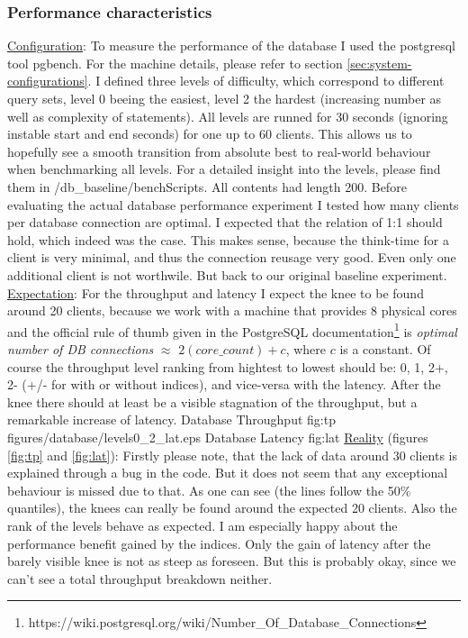 \documentclass[11pt]{article}
\begin{document}
\subsubsection{Performance characteristics}\label{sec:performance-characteristics}
\underline{Configuration}: To measure the performance of the database I used the postgresql tool pgbench. For the machine details, please refer to section \ref{sec:system-configurations}. I defined three levels of difficulty, which correspond to different query sets, level 0 beeing the easiest, level 2 the hardest (increasing number as well as complexity of statements). All levels are runned for 30 seconds (ignoring instable start and end seconds) for one up to 60 clients. This allows us to hopefully see a smooth transition from absolute best to real-world behaviour when benchmarking all levels. For a detailed insight into the levels, please find them in /db\_baseline/benchScripts. All contents had length 200. Before evaluating the actual database performance experiment I tested how many clients per database connection are optimal. I expected that the relation of 1:1 should hold, which indeed was the case. This makes sense, because the think-time for a client is very minimal, and thus the connection reusage very good. Even only one additional client is not worthwile. But back to our original baseline experiment.
\newline\underline{Expectation}: For the throughput and latency I expect the knee to be found around 20 clients, because we work with a machine that provides 8 physical cores and the official rule of thumb given in the PostgreSQL documentation\footnote[1]{https://wiki.postgresql.org/wiki/Number\_Of\_Database\_Connections} is \textit{optimal number of DB connections} $\approx$ $2(core\_count)+c$, where $c$ is a constant. Of course the throughput level ranking from hightest to lowest should be: 0, 1, 2+, 2- (+/- for with or without indices), and vice-versa with the latency. After the knee there should at least be a visible stagnation of the throughput, but a remarkable increase of latency.
 {Database Throughput} {fig:tp}
		{figures/database/levels0_2_lat.eps} {Database Latency} {fig:lat}
\newline\underline{Reality} (figures \ref{fig:tp} and \ref{fig:lat}): Firstly please note, that the lack of data around 30 clients is explained through a bug in the code. But it does not seem that any exceptional behaviour is missed due to that. As one can see (the lines follow the 50\% quantiles), the knees can really be found around the expected 20 clients. Also the rank of the levels behave as expected. I am especially happy about the performance benefit gained by the indices. Only the gain of latency after the barely visible knee is not as steep as foreseen. But this is probably okay, since we can't see a total throughput breakdown neither.
\end{document}
